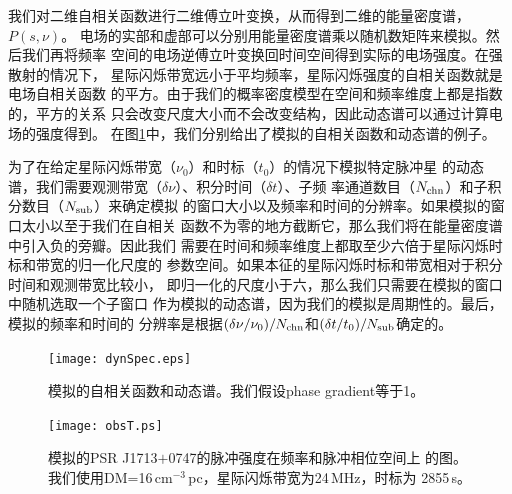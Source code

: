 我们对二维自相关函数进行二维傅立叶变换，从而得到二维的能量密度谱，$P(s,\nu)$。
电场的实部和虚部可以分别用能量密度谱乘以随机数矩阵来模拟。然后我们再将频率
空间的电场逆傅立叶变换回时间空间得到实际的电场强度。在强散射的情况下，
星际闪烁带宽远小于平均频率，星际闪烁强度的自相关函数就是电场自相关函数
的平方。由于我们的概率密度模型在空间和频率维度上都是指数的，平方的关系
只会改变尺度大小而不会改变结构，因此动态谱可以通过计算电场的强度得到。
在图\ref{acffig}中，我们分别给出了模拟的自相关函数和动态谱的例子。

为了在给定星际闪烁带宽（$\nu_0$）和时标（$t_0$）的情况下模拟特定脉冲星
的动态谱，我们需要观测带宽（$\delta\nu$）、积分时间（$\delta t$）、子频
率通道数目（$N_{\rm{chn}}$）和子积分数目（$N_{\rm{sub}}$）来确定模拟
的窗口大小以及频率和时间的分辨率。如果模拟的窗口太小以至于我们在自相关
函数不为零的地方截断它，那么我们将在能量密度谱中引入负的旁瓣。因此我们
需要在时间和频率维度上都取至少六倍于星际闪烁时标和带宽的归一化尺度的
参数空间。如果本征的星际闪烁时标和带宽相对于积分时间和观测带宽比较小，
即归一化的尺度小于六，那么我们只需要在模拟的窗口中随机选取一个子窗口
作为模拟的动态谱，因为我们的模拟是周期性的。最后，模拟的频率和时间的
分辨率是根据$(\delta\nu/\nu_0)/N_{\rm{chn}}$和$(\delta t/t_0)/N_{\rm{sub}}$确定的。


\begin{figure}
\begin{center}
\texttt{[image: dynSpec.eps]}
\end{center}
\caption{模拟的自相关函数和动态谱。我们假设phase gradient等于1。}
\label{acffig}
\end{figure}

\begin{figure}
\begin{center}
\texttt{[image: obsT.ps]}
\end{center}
\caption{模拟的PSR J1713$+$0747的脉冲强度在频率和脉冲相位空间上
的图。我们使用DM=16\,cm$^{-3}$\,pc，星际闪烁带宽为24\,MHz，时标为
2855\,s。}
\label{obs1}
\end{figure}

